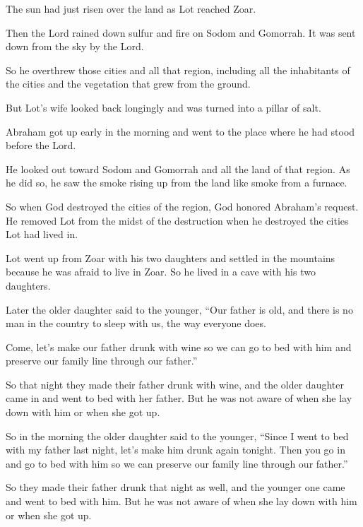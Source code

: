 \begin{scripture}
 The sun had just risen over the land as Lot reached Zoar.
 Then the Lord rained down sulfur and fire on Sodom and Gomorrah. It was sent down from the sky by the Lord.
 So he overthrew those cities and all that region, including all the inhabitants of the cities and the vegetation that grew from the ground.
 But Lot's wife looked back longingly and was turned into a pillar of salt.
\everypar{}

 Abraham got up early in the morning and went to the place where he had stood before the Lord.
 He looked out toward Sodom and Gomorrah and all the land of that region. As he did so, he saw the smoke rising up from the land like smoke from a furnace.
\everypar{}

 So when God destroyed the cities of the region, God honored Abraham's request. He removed Lot from the midst of the destruction when he destroyed the cities Lot had lived in.
\everypar{}

 Lot went up from Zoar with his two daughters and settled in the mountains because he was afraid to live in Zoar. So he lived in a cave with his two daughters.
 Later the older daughter said to the younger, ``Our father is old, and there is no man in the country to sleep with us, the way everyone does.
 Come, let's make our father drunk with wine so we can go to bed with him and preserve our family line through our father.''
\everypar{}

 So that night they made their father drunk with wine, and the older daughter came in and went to bed with her father. But he was not aware of when she lay down with him or when she got up.
 So in the morning the older daughter said to the younger, ``Since I went to bed with my father last night, let's make him drunk again tonight. Then you go in and go to bed with him so we can preserve our family line through our father.''
 So they made their father drunk that night as well, and the younger one came and went to bed with him. But he was not aware of when she lay down with him or when she got up.
\everypar{}


\end{scripture}
